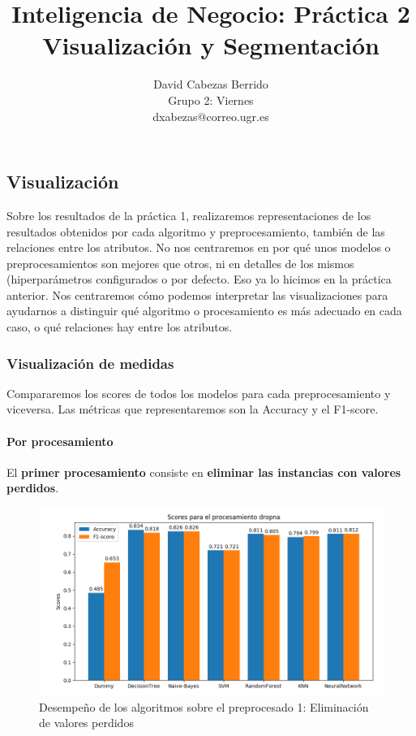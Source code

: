 \documentclass[oneside]{book}
\title{\Huge Inteligencia de Negocio: Práctica 2 \\ Visualización y Segmentación\vspace{10mm}}
\author{\huge David Cabezas Berrido \vspace{10mm} \\ 
  \huge Grupo 2: Viernes \vspace{10mm} \\ \huge dxabezas@correo.ugr.es \vspace{10mm}}
\begin{document}
\maketitle
\tableofcontents
\begin{center}
\vspace*{8cm}
\part{\textbf{Visualización}}
\end{center}

Sobre los resultados de la práctica 1, realizaremos representaciones
de los resultados obtenidos por cada algoritmo y preprocesamiento,
también de las relaciones entre los atributos. No nos centraremos en
por qué unos modelos o preprocesamientos son mejores que otros, ni en
detalles de los mismos (hiperparámetros configurados o por
defecto. Eso ya lo hicimos en la práctica anterior. Nos centraremos
cómo podemos interpretar las visualizaciones para ayudarnos a
distinguir qué algoritmo o procesamiento es más adecuado en cada caso,
o qué relaciones hay entre los atributos.

\section{Visualización de medidas}
Compararemos los scores de todos los modelos para cada
preprocesamiento y viceversa. Las métricas que representaremos son la
Accuracy y el F1-score.

\subsection{Por procesamiento}

El \textbf{primer procesamiento} consiste en \textbf{eliminar las
  instancias con valores perdidos}.

\begin{figure}[H]
  \centering
  \caption{Desempeño de los algoritmos sobre el preprocesado 1: Eliminación de valores perdidos}
  \label{fig:dropna}
  \includegraphics[width=180mm]{figures/visualizacion/dropna}
\end{figure}
\end{document}
